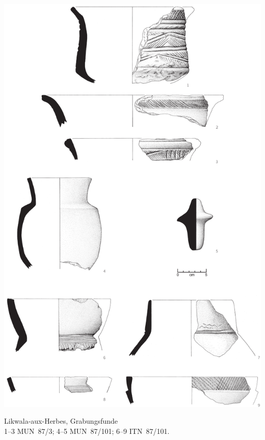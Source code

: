 \begin{pl}[H]
	\includegraphics{plt/Taf94.pdf}
	\vspace{.75em}\caption{Likwala-aux-Herbes, Grabungsfunde \\ 1--3 MUN~87/3; 4--5 MUN~87/101; 6--9 ITN~87/101.}
	\label{pl:94}
\end{pl}

